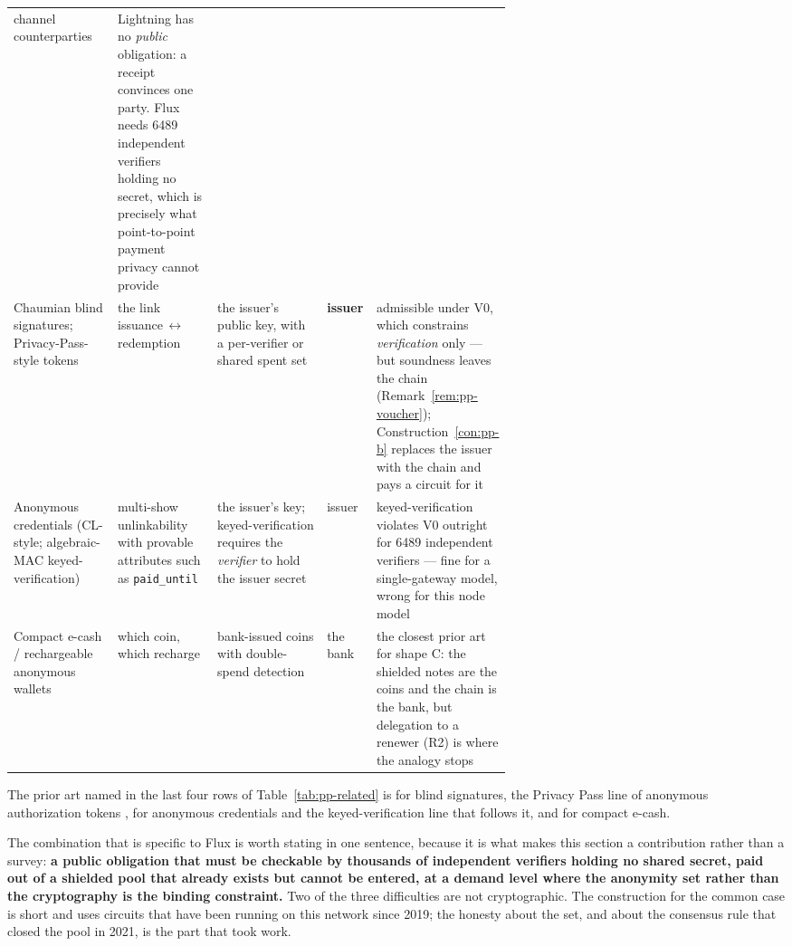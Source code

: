 \begin{table}[H]
\begin{tabular}{@{}lp{0.20\linewidth}p{0.22\linewidth}lp{0.22\linewidth}@{}}
channel counterparties &
Lightning has no \emph{public} obligation: a receipt convinces one party. Flux needs \num{6489}
independent verifiers holding no secret, which is precisely what point-to-point payment privacy
cannot provide \\
\addlinespace
Chaumian blind signatures; Privacy-Pass-style tokens &
the link issuance\,$\leftrightarrow$\,redemption &
the issuer's public key, with a per-verifier or shared spent set &
\textbf{issuer} &
admissible under V0, which constrains \emph{verification} only --- but soundness leaves the chain
(Remark~\ref{rem:pp-voucher}); Construction~\ref{con:pp-b} replaces the issuer with the chain and pays
a circuit for it \\
\addlinespace
Anonymous credentials (CL-style; algebraic-MAC keyed-verification) &
multi-show unlinkability with provable attributes such as \texttt{paid\_until} &
the issuer's key; keyed-verification requires the \emph{verifier} to hold the issuer secret &
issuer &
keyed-verification violates V0 outright for \num{6489} independent verifiers --- fine for a
single-gateway model, wrong for this node model \\
\addlinespace
Compact e-cash / rechargeable anonymous wallets &
which coin, which recharge &
bank-issued coins with double-spend detection &
the bank &
the closest prior art for shape C: the shielded notes are the coins and the chain is the bank, but
delegation to a renewer (R2) is where the analogy stops \\
\bottomrule
\end{tabular}
\end{table}

The prior art named in the last four rows of Table~\ref{tab:pp-related} is
\citet{chaum1982blind} for blind signatures, the Privacy Pass line of anonymous authorization tokens
\citep{privacypass}, \citet{camenisch2001credentials} for anonymous credentials and the
keyed-verification line that follows it, and \citet{camenisch2005ecash} for compact e-cash.

The combination that is specific to Flux is worth stating in one sentence, because it is what makes
this section a contribution rather than a survey: \textbf{a public obligation that must be checkable
by thousands of independent verifiers holding no shared secret, paid out of a shielded pool that
already exists but cannot be entered, at a demand level where the anonymity set rather than the
cryptography is the binding constraint.} Two of the three difficulties are not cryptographic. The
construction for the common case is short and uses circuits that have been running on this network
since 2019; the honesty about the set, and about the consensus rule that closed the pool in 2021, is
the part that took work.

\FloatBarrier
